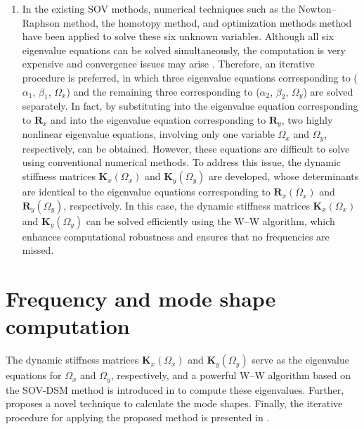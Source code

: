 \documentclass[preprint,12pt,number]{elsarticle}
\begin{document}
\begin{enumerate}[label=(\roman*)]
	\item In the existing SOV methods, numerical techniques such as the Newton–Raphson method, the homotopy method, and optimization methods method have been applied to solve these six unknown variables.  
	Although all six eigenvalue equations can be solved simultaneously, the computation is very expensive and convergence issues may arise \citep{wang2021extended,wang2021closed}.  
	Therefore, an iterative procedure \cite{xing2018overall,wang2021extended,wang2021closed,wang2019highly,wang2020highly} is preferred, in which three eigenvalue equations corresponding to ($\alpha_1$, $\beta_1$, $\Omega_x$) and the remaining three corresponding to ($\alpha_2$, $\beta_2$, $\Omega_y$) are solved separately.
	In fact, by substituting  into the eigenvalue equation corresponding to $\mathbf{R}_x$ and  into the eigenvalue equation corresponding to $\mathbf{R}_y$, two highly nonlinear eigenvalue equations, involving only one variable $\Omega_x$ and $\Omega_y$, respectively, can be obtained. 
	However, these equations are difficult to solve using conventional numerical methods.
	To address this issue, the dynamic stiffness matrices $\mathbf{K}_x(\Omega_x)$ and $\mathbf{K}_y(\Omega_y)$ are developed, whose determinants are identical to the eigenvalue equations corresponding to $\mathbf{R}_x(\Omega_x)$ and $\mathbf{R}_y(\Omega_y)$, respectively.
	In this case, the dynamic stiffness matrices $\mathbf{K}_x(\Omega_x)$ and $\mathbf{K}_y(\Omega_y)$ can be solved efficiently using the W–W algorithm, which enhances computational robustness and ensures that no frequencies are missed.
\end{enumerate}

 
\section{Frequency and mode shape computation}\label{sec:WWA}
The dynamic stiffness matrices $\mathbf{K}_x(\Omega_x)$ and $\mathbf{K}_y(\Omega_y)$ serve as the eigenvalue equations for $\Omega_x$ and $\Omega_y$, respectively, and a powerful W–W algorithm based on the SOV-DSM method is introduced in  to compute these eigenvalues.
Further,  proposes a novel technique to calculate the mode shapes.  
Finally, the iterative procedure for applying the proposed method is presented in .
\end{document}
